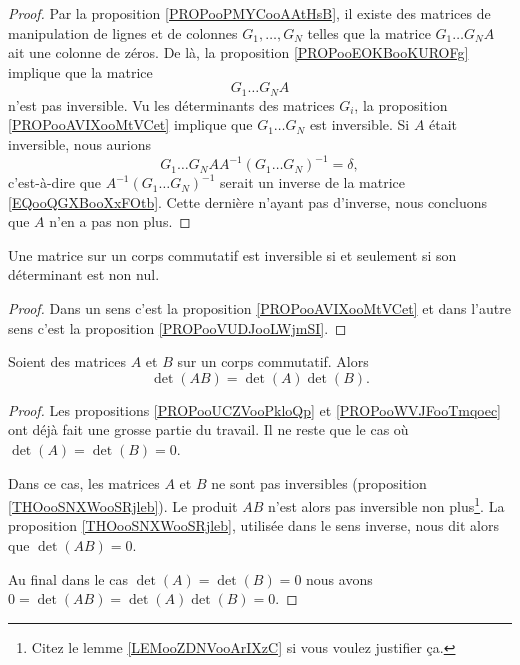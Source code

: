 \begin{proof}
	Par la proposition \ref{PROPooPMYCooAAtHsB}, il existe des matrices de manipulation de lignes et de colonnes \( G_1,\ldots, G_N\) telles que la matrice \( G_1\ldots G_NA\) ait une colonne de zéros. De là, la proposition \ref{PROPooEOKBooKUROFg} implique que la matrice
	\begin{equation}        \label{EQooQGXBooXxFOtb}
		G_1\ldots G_NA
	\end{equation}
	n'est pas inversible. Vu les déterminants des matrices \( G_i\),  la proposition \ref{PROPooAVIXooMtVCet} implique que \( G_1\ldots G_N\) est inversible. Si \( A\) était inversible, nous aurions
	\begin{equation}
		G_1\dots G_NAA^{-1}(G_1\ldots G_N)^{-1}=\delta,
	\end{equation}
	c'est-à-dire que \( A^{-1}(G_1\ldots G_N)^{-1}\) serait un inverse de la matrice \eqref{EQooQGXBooXxFOtb}. Cette dernière n'ayant pas d'inverse, nous concluons que \( A\) n'en a pas non plus.
\end{proof}

\begin{theorem}     \label{THOooSNXWooSRjleb}
	Une matrice sur un corps commutatif est inversible si et seulement si son déterminant est non nul.
\end{theorem}

\begin{proof}
	Dans un sens c'est la proposition \ref{PROPooAVIXooMtVCet} et dans l'autre sens c'est la proposition \ref{PROPooVUDJooLWjmSI}.
\end{proof}


\begin{proposition}     \label{PROPooHQNPooIfPEDH}
	Soient des matrices \( A\) et \( B\) sur un corps commutatif. Alors
	\begin{equation}
		\det(AB)=\det(A)\det(B).
	\end{equation}
\end{proposition}

\begin{proof}
	Les propositions \ref{PROPooUCZVooPkloQp} et \ref{PROPooWVJFooTmqoec} ont déjà fait une grosse partie du travail. Il ne reste que le cas où \( \det(A)=\det(B)=0\).

	Dans ce cas, les matrices \( A\) et \( B\) ne sont pas inversibles (proposition \ref{THOooSNXWooSRjleb}). Le produit \( AB\) n'est alors pas inversible non plus\footnote{Citez le lemme \ref{LEMooZDNVooArIXzC} si vous voulez justifier ça.}. La proposition \ref{THOooSNXWooSRjleb}, utilisée dans le sens inverse, nous dit alors que \( \det(AB)=0\).

	Au final dans le cas \( \det(A)=\det(B)=0\) nous avons \( 0=\det(AB)=\det(A)\det(B)=0\).
\end{proof}

